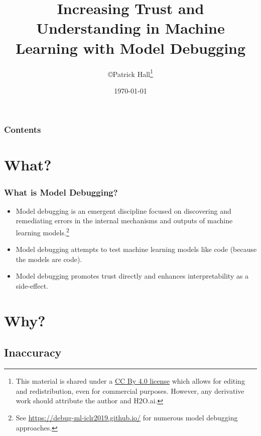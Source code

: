 \documentclass[11pt,
               aspectratio=43,
               hyperref={colorlinks}
               ]{beamer}
\author{\copyright\hspace{1pt}Patrick Hall\footnote{\tiny{This material is shared under a \href{https://creativecommons.org/licenses/by/4.0/deed.ast}{CC By 4.0 license} which allows for editing and redistribution, even for commercial purposes. However, any derivative work should attribute the author and H2O.ai.}}}
\title{Increasing Trust and Understanding in Machine Learning with Model Debugging }
\institute{\href{https://www.h2o.ai}{H\textsubscript{2}O.ai}}
\date{\today}
\begin{document}
	
	\maketitle
	
	\begin{frame}
	
		\frametitle{Contents}
		
		\tableofcontents{}
		
	\end{frame}

	\section{What?}

	\begin{frame}
		
		\frametitle{What is Model Debugging?}
		
		\begin{itemize}
			\item Model debugging is an emergent discipline focused on discovering and remediating errors in the internal mechanisms and outputs of machine learning models.\footnote{\tiny{See \url{https://debug-ml-iclr2019.github.io/} for numerous model debugging approaches.}} 
			\item Model debugging attempts to test machine learning models like code (because the models are code).
			\item Model debugging promotes trust directly and enhances interpretability as a side-effect.
		\end{itemize}
		
	\end{frame}

	\section{Why?}

		\subsection{Inaccuracy}
\end{document}
